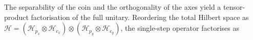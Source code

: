 The separability of the coin and the orthogonality of the axes yield
a tensor-product factorisation of the full unitary. Reordering the
total Hilbert space as $\mathcal{H} = (\mathcal{H}_{p_x} \otimes
\mathcal{H}_{c_x}) \otimes (\mathcal{H}_{p_y} \otimes
\mathcal{H}_{c_y})$, the single-step operator factorises as
